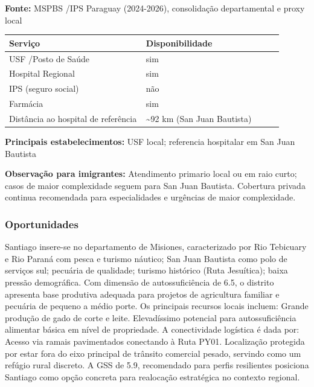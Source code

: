 \textbf{Fonte:} MSPBS /\allowbreak  IPS Paraguay (2024-2026), consolidação
departamental e proxy local

{\def\LTcaptype{none} %
\begin{longtable}{@{}>{\raggedright\arraybackslash}p{0.45\linewidth} >{\raggedright\arraybackslash}p{0.45\linewidth}@{}}
\toprule\noalign{}
Serviço & Disponibilidade \\
\midrule\noalign{}
\endhead
\bottomrule\noalign{}
\endlastfoot
USF /\allowbreak  Posto de Saúde & sim \\
Hospital Regional & sim \\
IPS (seguro social) & não \\
Farmácia & sim \\
Distância ao hospital de referência & \textasciitilde92 km (San Juan
Bautista) \\
\end{longtable}
}

\textbf{Principais estabelecimentos:} USF local; referencia hospitalar
em San Juan Bautista

\textbf{Observação para imigrantes:} Atendimento primario local ou em
raio curto; casos de maior complexidade seguem para San Juan Bautista.
Cobertura privada continua recomendada para especialidades e urgências
de maior complexidade.
\newpage

\subsubsection*{Oportunidades}\label{oport-santiago-0808}
Santiago insere-se no departamento de Misiones, caracterizado por Rio Tebicuary e Rio Paraná com pesca e turismo náutico; San Juan Bautista como polo de serviços sul; pecuária de qualidade; turismo histórico (Ruta Jesuítica); baixa pressão demográfica. Com dimensão de autossuficiência de 6.5, o distrito apresenta base produtiva adequada para projetos de agricultura familiar e pecuária de pequeno a médio porte. Os principais recursos locais incluem: Grande produção de gado de corte e leite. Elevadíssimo potencial para autossuficiência alimentar básica em nível de propriedade. A conectividade logística é dada por: Acesso via ramais pavimentados conectando à Ruta PY01. Localização protegida por estar fora do eixo principal de trânsito comercial pesado, servindo como um refúgio rural discreto. A GSS de 5.9, recomendado para perfis resilientes posiciona Santiago como opção concreta para realocação estratégica no contexto regional.

